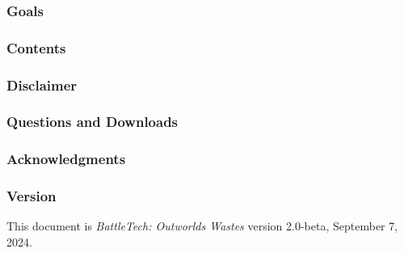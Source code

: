 

\subsubsection*{Goals}



\subsubsection*{Contents}



\subsubsection*{Disclaimer}



\subsubsection*{Questions and Downloads}



\subsubsection*{Acknowledgments}



\subsubsection*{Version}

This document is \emph{BattleTech: Outworlds Wastes} version 2.0-beta, September 7, 2024.

\newpage

\vspace*{\fill}

\vspace*{\fill}
